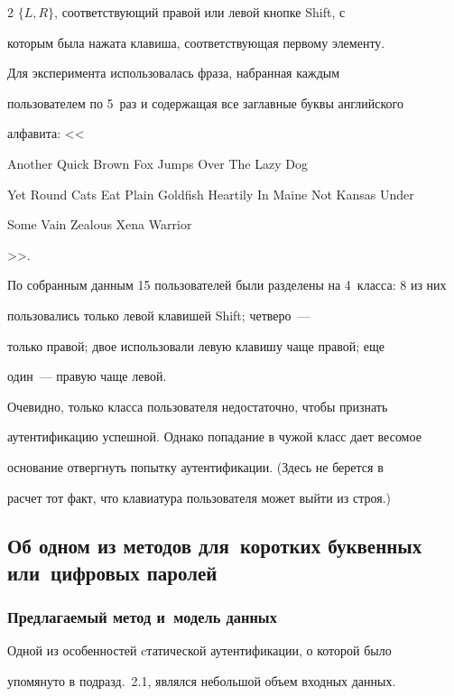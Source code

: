 \begin{multicols}{2}
$\{L,R\}$, соответствующий правой или левой кнопке {\sf Shift}, с

которым была нажата клавиша, соответствующая первому элементу.



Для эксперимента использовалась фраза, набранная каждым

пользователем по 5~раз и содержащая все заглавные буквы английского

алфавита: <<{\sf Another Quick Brown Fox Jumps Over The Lazy Dog

Yet Round Cats Eat Plain Goldfish Heartily In Maine Not Kansas Under

Some Vain Zealous Xena Warrior}>>.



По собранным данным 15 пользователей были разделены на 4~класса: 8 из них

 пользовались только левой клавишей {\sf Shift}; четверо~---

только правой; двое использовали левую клавишу чаще правой; еще

один~--- правую чаще левой.



Очевидно, только класса пользователя недостаточно, чтобы признать

аутентификацию успешной. Однако попадание в чужой класс дает весомое

основание отвергнуть попытку аутентификации. (Здесь не берется в

расчет тот факт, что клавиатура пользователя может выйти из строя.)









\subsection{Об одном из методов для~коротких буквенных или~цифровых паролей}



\subsubsection{Предлагаемый метод и~модель данных}



Одной из особенностей cтатической аутентификации, о которой было

упомянуто в подразд.~2.1, являлся небольшой объем входных данных. 


\end{multicols}
